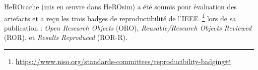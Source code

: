 HeROcache (mis en œuvre dans HeROsim) a été soumis pour évaluation des artefacts et a reçu les trois badges de reproductibilité de l'IEEE~\footnote{\href{https://www.niso.org/standards-committees/reproducibility-badging}{https://www.niso.org/standards-committees/reproducibility-badging}} lors de sa publication : \textit{Open Research Objects} (ORO), \textit{Reusable/Research Objects Reviewed} (ROR), et \textit{Results Reproduced} (ROR-R).





